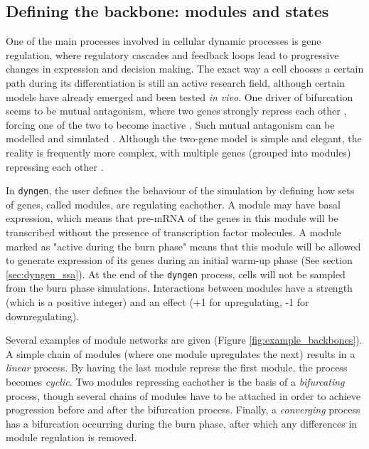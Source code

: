 \subsection{Defining the backbone: modules and states} \label{sec:backbone}

One of the main processes involved in cellular dynamic processes is gene regulation, where regulatory cascades and feedback loops lead to progressive changes in expression and decision making. The exact way a cell chooses a certain path during its differentiation is still an active research field, although certain models have already emerged and been tested \textit{in vivo}. One driver of bifurcation seems to be mutual antagonism, where two genes strongly repress each other \cite{rekhtman_directinteractionhematopoietic_1999,xu_regulationbifurcatingcell_2015}, forcing one of the two to become inactive \cite{graf_forcingcellschange_2009}. Such mutual antagonism can be modelled and simulated \cite{wang_quantifyingwaddingtonlandscape_2011, ferrell_bistabilitybifurcationswaddington_2012}. Although the two-gene model is simple and elegant, the reality is frequently more complex, with multiple genes (grouped into modules) repressing each other \cite{yosef_dynamicregulatorynetwork_2013}.

In \texttt{dyngen}, the user defines the behaviour of the simulation by defining how sets of genes, called modules, are regulating eachother.
A module may have basal expression, which means that pre-mRNA of the genes in this module will be transcribed without the presence of transcription factor molecules. A module marked as "active during the burn phase" means that this module will be allowed to generate expression of its genes during an initial warm-up phase (See section \ref{sec:dyngen_ssa}). At the end of the \texttt{dyngen} process, cells will not be sampled from the burn phase simulations. Interactions between modules have a strength (which is a positive integer) and an effect (+1 for upregulating, -1 for downregulating).

Several examples of module networks are given (Figure \ref{fig:example_backbones}). 
A simple chain of modules (where one module upregulates the next) results in a \emph{linear} process. By having the last module repress the first module, the process becomes \emph{cyclic}. Two modules repressing eachother is the basis of a \emph{bifurcating} process, though several chains of modules have to be attached in order to achieve progression before and after the bifurcation process. Finally, a \emph{converging} process has a bifurcation occurring during the burn phase, after which any differences in module regulation is removed.

